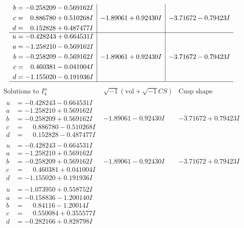 \documentclass[1p]{elsarticle_modified}
\theoremstyle{definition}
\newcommand{\I}{\sqrt{-1}}
\begin{document}
$$\begin{array}{c|c|c}
\begin{aligned}
b &= -0.258209 - 0.569162 I \\
c &= \phantom{-}0.886780 + 0.510268 I \\
d &= \phantom{-}0.152828 + 0.487477 I\end{aligned}
 & -1.89061 + 0.92430 I & -3.71672 - 0.79423 I \\ \hline\begin{aligned}
u &= -0.428243 + 0.664531 I \\
a &= -1.258210 - 0.569162 I \\
b &= -0.258209 - 0.569162 I \\
c &= \phantom{-}0.460381 - 0.041004 I \\
d &= -1.155020 - 0.191936 I\end{aligned}
 & -1.89061 + 0.92430 I & -3.71672 - 0.79423 I\\
 \hline 
 \end{array}$$\newpage$$\begin{array}{c|c|c}  
\text{Solutions to }I^u_{4}& \I (\text{vol} + \sqrt{-1}CS) & \text{Cusp shape}\\
 \hline 
\begin{aligned}
u &= -0.428243 - 0.664531 I \\
a &= -1.258210 + 0.569162 I \\
b &= -0.258209 + 0.569162 I \\
c &= \phantom{-}0.886780 - 0.510268 I \\
d &= \phantom{-}0.152828 - 0.487477 I\end{aligned}
 & -1.89061 - 0.92430 I & -3.71672 + 0.79423 I \\ \hline\begin{aligned}
u &= -0.428243 - 0.664531 I \\
a &= -1.258210 + 0.569162 I \\
b &= -0.258209 + 0.569162 I \\
c &= \phantom{-}0.460381 + 0.041004 I \\
d &= -1.155020 + 0.191936 I\end{aligned}
 & -1.89061 - 0.92430 I & -3.71672 + 0.79423 I \\ \hline\begin{aligned}
u &= -1.073950 + 0.558752 I \\
a &= -0.158836 - 1.200140 I \\
b &= \phantom{-}0.84116 - 1.20014 I \\
c &= \phantom{-}0.550084 + 0.355577 I \\
d &= -0.282166 + 0.828798 I\end{aligned}

\end{array}$$
\end{document}
